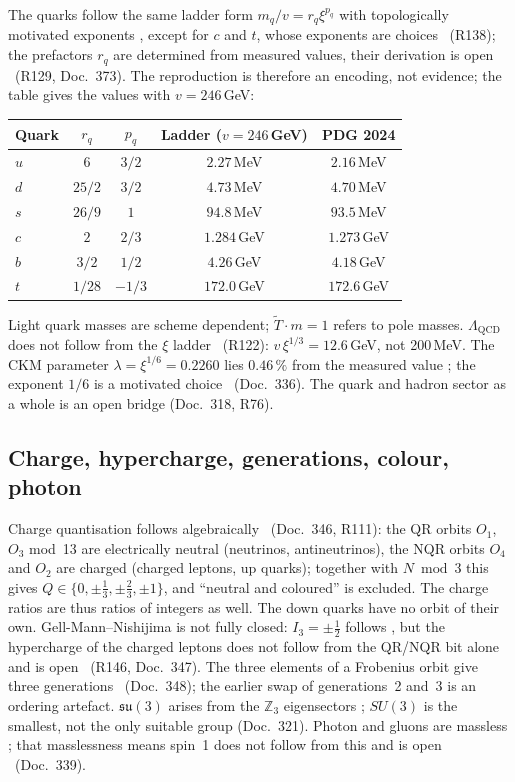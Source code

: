 The quarks follow the same ladder form $m_q/v=r_q\xi^{p_q}$ with topologically motivated
exponents \KM, except for $c$ and $t$, whose exponents are choices \SM\ (R138); the prefactors
$r_q$ are determined from measured values, their derivation is open \SM\ (R129, Doc.~373). The
reproduction is therefore an encoding, not evidence; the table gives the values with
$v=246$\,GeV:
\begin{center}
\small
\begin{tabular}{@{}lcccc@{}}
\toprule
\textbf{Quark} & $r_q$ & $p_q$ & \textbf{Ladder} ($v=246$\,GeV) & \textbf{PDG 2024} \\
\midrule
$u$ & $6$ & $3/2$ & $2.27$\,MeV & $2.16$\,MeV \\
$d$ & $25/2$ & $3/2$ & $4.73$\,MeV & $4.70$\,MeV \\
$s$ & $26/9$ & $1$ & $94.8$\,MeV & $93.5$\,MeV \\
$c$ & $2$ & $2/3$ & $1.284$\,GeV & $1.273$\,GeV \\
$b$ & $3/2$ & $1/2$ & $4.26$\,GeV & $4.18$\,GeV \\
$t$ & $1/28$ & $-1/3$ & $172.0$\,GeV & $172.6$\,GeV \\
\bottomrule
\end{tabular}
\end{center}
Light quark masses are scheme dependent; $\tilde T\cdot m=1$ refers to pole masses.
$\Lambda_{\text{QCD}}$ does not follow from the $\xi$ ladder \XM\ (R122): $v\,\xi^{1/3}=12.6$\,GeV,
not 200\,MeV. The CKM parameter $\lambda=\xi^{1/6}=0.2260$ lies $0.46\,\%$ from the measured
value \KM; the exponent $1/6$ is a motivated choice \SM\ (Doc.~336). The quark and hadron
sector as a whole is an open bridge (Doc.~318, R76).

\subsection{Charge, hypercharge, generations, colour, photon}

Charge quantisation follows algebraically \BM\ (Doc.~346, R111): the QR orbits $O_1$, $O_3$
mod~13 are electrically neutral (neutrinos, antineutrinos), the NQR orbits $O_4$ and $O_2$ are
charged (charged leptons, up quarks); together with $N\bmod3$ this gives
$Q\in\{0,\pm\tfrac13,\pm\tfrac23,\pm1\}$, and ``neutral and coloured'' is excluded. The charge
ratios are thus ratios of integers as well. The down quarks have no orbit of their own.
Gell-Mann--Nishijima is not fully closed: $I_3=\pm\tfrac12$ follows \BM, but the hypercharge of
the charged leptons does not follow from the QR/NQR bit alone and is open \SM\ (R146, Doc.~347).
The three elements of a Frobenius orbit give three generations \BM\ (Doc.~348); the earlier swap
of generations~2 and~3 is an ordering artefact. $\mathfrak{su}(3)$ arises from the
$\mathbb Z_3$ eigensectors \BM; $SU(3)$ is the smallest, not the only suitable group
(Doc.~321). Photon and gluons are massless \BM; that masslessness means spin~1 does not follow
from this and is open \SM\ (Doc.~339).

